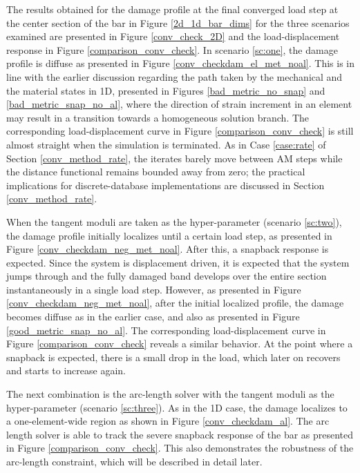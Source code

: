 \documentclass[10pt]{cas-sc}
\newcommand{\deleted}[1]{}
\newcommand{\added}[1]{#1}
\begin{document}
The results obtained for the damage profile \added{at the final converged load step} at the center section of the bar in Figure \ref{2d_1d_bar_dims} \added{for the three scenarios examined} are presented in Figure \ref{conv_check_2D} and the load-displacement response in Figure \ref{comparison_conv_check}. \deleted{When the damaged elastic moduli are taken as the hyper-parameters, the}\added{In scenario \ref{sc:one}, the} damage profile is diffuse as presented in Figure \ref{conv_checkdam_el_met_noal}\deleted{, even if there is no regularization in the problem}. This is in line with the earlier discussion regarding the path taken by the mechanical and the material states in 1D, presented in Figures \ref{bad_metric_no_snap} and \ref{bad_metric_snap_no_al}, where the direction of strain increment in an element may result in a transition towards a homogeneous solution branch. The corresponding load-displacement curve in Figure \ref{comparison_conv_check} is still almost straight when the simulation is terminated. \deleted{The simulation has been terminated early since the number of iterations till convergence (till successive material points are close) are very high. The distance functional remains large even though the successive material iterates are closer.}\added{As in Case \ref{case:rate} of Section \ref{conv_method_rate}, the iterates barely move between AM steps while the distance functional remains bounded away from zero; the practical implications for discrete-database implementations are discussed in Section \ref{conv_method_rate}.}

When the tangent moduli are taken as the hyper-parameter\added{ (scenario \ref{sc:two})}, the damage profile initially localizes until a certain load step, as presented in Figure \ref{conv_checkdam_neg_met_noal}. After this, a snapback response is expected. Since the system is displacement driven, it is expected that the system jumps through and the fully damaged band develops over the entire section instantaneously in a single load step. However, as presented in Figure \ref{conv_checkdam_neg_met_noal}, after the initial localized profile, the damage becomes diffuse as in the earlier case, and also as presented in Figure \ref{good_metric_snap_no_al}. The corresponding load-displacement curve in Figure \ref{comparison_conv_check} reveals a similar behavior. At the point where a snapback is expected, there is a small drop in the load, which later on recovers and starts to increase again. 

The next combination is the arc-length solver with the tangent moduli as the hyper-parameter\added{ (scenario \ref{sc:three})}. As in the 1D case, the damage localizes to a one-element-wide region as shown in Figure \ref{conv_checkdam_al}. The arc length solver is able to track the severe snapback response of the bar as presented in Figure \ref{comparison_conv_check}. This also demonstrates the robustness of the arc-length constraint, which will be described in detail later.
\end{document}
